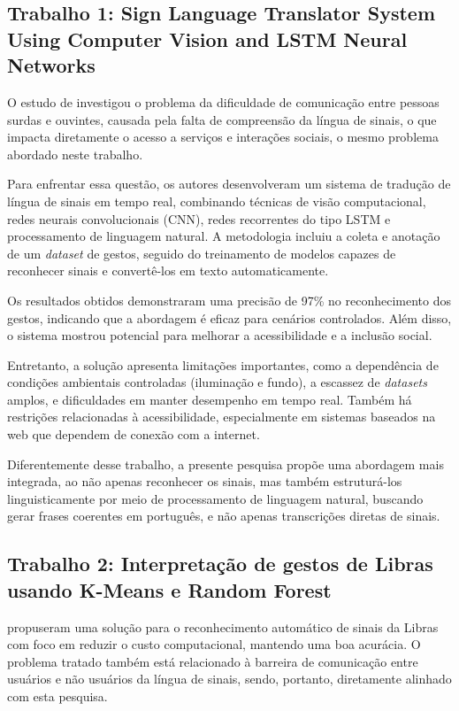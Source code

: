 \documentclass[
    12pt,                %
    openright,           %
    oneside,             %
    a4paper,             %
    english,             %
    brazil               %
]{abntex2}
\begin{document}
\subsection{Trabalho 1: Sign Language Translator System Using Computer Vision and LSTM Neural Networks}

O estudo de  investigou o problema da dificuldade de comunicação entre pessoas surdas e ouvintes, causada pela falta de compreensão da língua de sinais, o que impacta diretamente o acesso a serviços e interações sociais, o mesmo problema abordado neste trabalho.

Para enfrentar essa questão, os autores desenvolveram um sistema de tradução de língua de sinais em tempo real, combinando técnicas de visão computacional, redes neurais convolucionais (CNN), redes recorrentes do tipo LSTM e processamento de linguagem natural. A metodologia incluiu a coleta e anotação de um \textit{dataset} de gestos, seguido do treinamento de modelos capazes de reconhecer sinais e convertê-los em texto automaticamente.

Os resultados obtidos demonstraram uma precisão de 97\% no reconhecimento dos gestos, indicando que a abordagem é eficaz para cenários controlados. Além disso, o sistema mostrou potencial para melhorar a acessibilidade e a inclusão social.

Entretanto, a solução apresenta limitações importantes, como a dependência de condições ambientais controladas (iluminação e fundo), a escassez de \textit{datasets} amplos, e dificuldades em manter desempenho em tempo real. Também há restrições relacionadas à acessibilidade, especialmente em sistemas baseados na web que dependem de conexão com a internet.

Diferentemente desse trabalho, a presente pesquisa propõe uma abordagem mais integrada, ao não apenas reconhecer os sinais, mas também estruturá-los linguisticamente por meio de processamento de linguagem natural, buscando gerar frases coerentes em português, e não apenas transcrições diretas de sinais.

\subsection{Trabalho 2: Interpretação de gestos de Libras usando K-Means e Random Forest}

 propuseram uma solução para o reconhecimento automático de sinais da Libras com foco em reduzir o custo computacional, mantendo uma boa acurácia. O problema tratado também está relacionado à barreira de comunicação entre usuários e não usuários da língua de sinais, sendo, portanto, diretamente alinhado com esta pesquisa.
\end{document}
